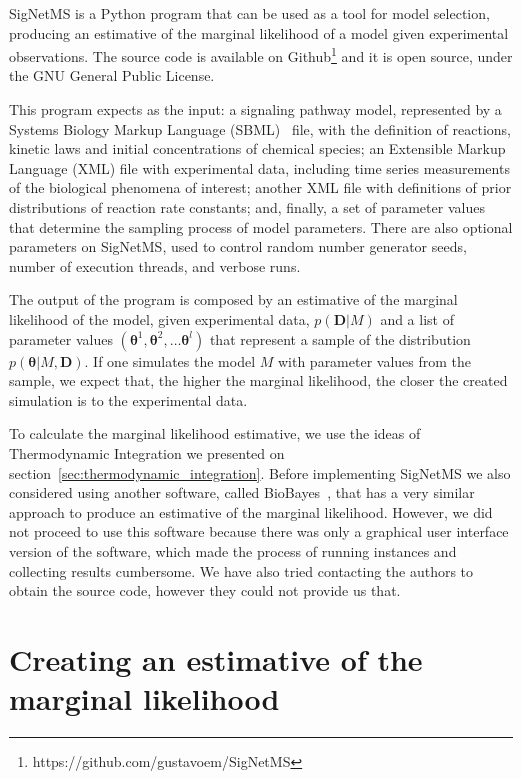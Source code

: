 SigNetMS is a Python program that can be used as a tool for model
selection, producing an estimative of the marginal likelihood of a model
given experimental observations. The source code is available on 
Github\footnote{https://github.com/gustavoem/SigNetMS} and it is open
source, under the GNU General Public License.

This program expects as the input: a signaling pathway model,
represented by a Systems Biology Markup Language
(SBML)~\cite{hucka2003systems} file, with the definition of reactions,
kinetic laws and initial concentrations of chemical species; an
Extensible Markup Language (XML) file with experimental data, including 
time series measurements of the  biological phenomena of interest;
another XML file with definitions of prior distributions of reaction
rate constants; and, finally, a set of parameter values that determine
the sampling process of model parameters. There are also optional
parameters on SigNetMS, used to control random number generator seeds,
number of execution threads, and verbose runs.

The output of the program is composed by an estimative of the marginal
likelihood of the model, given experimental data, $p({\bm D} | M)$ and a
list of parameter values $({\bm \theta}^1, {\bm \theta}^2, \ldots {\bm
\theta}^l)$ that represent a sample of the distribution $p({\bm \theta}
| M, {\bm D})$. If one simulates the model $M$ with parameter values
from the sample, we expect that, the higher the marginal likelihood, the
closer the created simulation is to the experimental data.

To calculate the marginal likelihood estimative, we use the ideas of 
Thermodynamic Integration we presented on 
section~\ref{sec:thermodynamic_integration}. Before implementing
SigNetMS we also considered using another software, called
BioBayes~\cite{Vyshemirsky2008}, that has a very similar approach to
produce an estimative of the marginal likelihood. However, we did not
proceed to use this software because there was only a graphical user
interface version of the software, which made the process of running
instances and collecting results cumbersome. We have also tried
contacting the authors to obtain the source code, however they could not
provide us that.

\section{Creating an estimative of the marginal likelihood}

